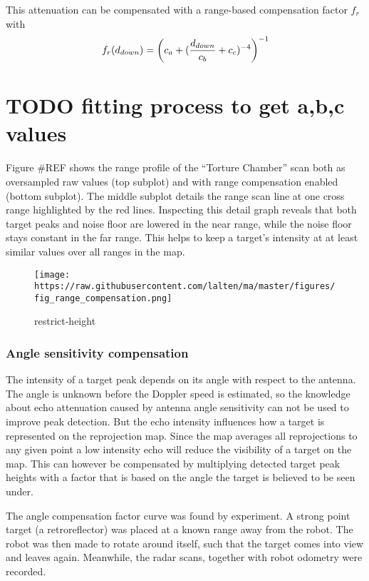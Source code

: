 This attenuation can be compensated with a range-based compensation
factor \(f_r\) with \[f_r(d_{down}) = {
\left(
c_a + (
{{d_{down}}\over{c_b}}
+ c_c)^{-4}
\right) ^ {-1}
}\]

\section{TODO fitting process to get a,b,c
values}\label{todo-fitting-process-to-get-abc-values}

Figure \#REF shows the range profile of the ``Torture Chamber'' scan
both as oversampled raw values (top subplot) and with range compensation
enabled (bottom subplot). The middle subplot details the range scan line
at one cross range highlighted by the red lines. Inspecting this detail
graph reveals that both target peaks and noise floor are lowered in the
near range, while the noise floor stays constant in the far range. This
helps to keep a target's intensity at at least similar values over all
ranges in the map.

\begin{figure}
\centering
\texttt{[image: https://raw.githubusercontent.com/lalten/ma/master/figures/fig\_range\_compensation.png]}
\caption{restrict-height}
\end{figure}

\subsubsection{Angle sensitivity
compensation}\label{angle-sensitivity-compensation}

The intensity of a target peak depends on its angle with respect to the
antenna. The angle is unknown before the Doppler speed is estimated, so
the knowledge about echo attenuation caused by antenna angle sensitivity
can not be used to improve peak detection. But the echo intensity
influences how a target is represented on the reprojection map. Since
the map averages all reprojections to any given point a low intensity
echo will reduce the visibility of a target on the map. This can however
be compensated by multiplying detected target peak heights with a factor
that is based on the angle the target is believed to be seen under.

The angle compensation factor curve was found by experiment. A strong
point target (a retroreflector) was placed at a known range away from
the robot. The robot was then made to rotate around itself, such that
the target comes into view and leaves again. Meanwhile, the radar scans,
together with robot odometry were recorded.

